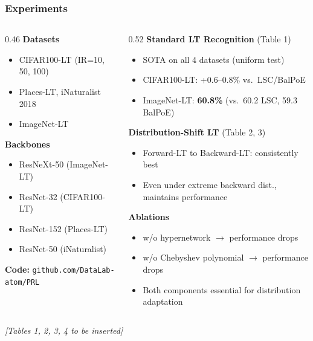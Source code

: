 \documentclass[10pt,aspectratio=169]{beamer}
\begin{document}
\begin{frame}
\frametitle{Experiments}
{\small
\begin{columns}[T]
\begin{column}{0.46\textwidth}
\textbf{Datasets}
\begin{itemize}\setlength\itemsep{1pt}
  \item CIFAR100-LT {\scriptsize (IR=10, 50, 100)}
  \item Places-LT, iNaturalist 2018
  \item ImageNet-LT
\end{itemize}
\vspace{3pt}
\textbf{Backbones}
\begin{itemize}\setlength\itemsep{1pt}
  \item ResNeXt-50 (ImageNet-LT)
  \item ResNet-32 (CIFAR100-LT)
  \item ResNet-152 (Places-LT)
  \item ResNet-50 (iNaturalist)
\end{itemize}
\vspace{2pt}
\textbf{Code:} \texttt{github.com/DataLab-atom/PRL}
\end{column}
\begin{column}{0.52\textwidth}
\textbf{Standard LT Recognition} (Table 1)
{\scriptsize
\begin{itemize}\setlength\itemsep{2pt}
  \item SOTA on all 4 datasets (uniform test)
  \item CIFAR100-LT: +0.6--0.8\% vs.\ LSC/BalPoE
  \item ImageNet-LT: \textbf{60.8\%} (vs.\ 60.2 LSC, 59.3 BalPoE)
\end{itemize}
}
\vspace{3pt}
\textbf{Distribution-Shift LT} (Table 2, 3)
{\scriptsize
\begin{itemize}\setlength\itemsep{2pt}
  \item Forward-LT to Backward-LT: consistently best
  \item Even under extreme backward dist., maintains performance
\end{itemize}
}
\vspace{3pt}
\textbf{Ablations}
{\scriptsize
\begin{itemize}\setlength\itemsep{2pt}
  \item w/o hypernetwork $\rightarrow$ performance drops
  \item w/o Chebyshev polynomial $\rightarrow$ performance drops
  \item Both components essential for distribution adaptation
\end{itemize}
}
\end{column}
\end{columns}
\vspace{4pt}
\begin{center}
{\footnotesize \textit{[Tables 1, 2, 3, 4 to be inserted]}}
\end{center}
}
\end{frame}
\end{document}
